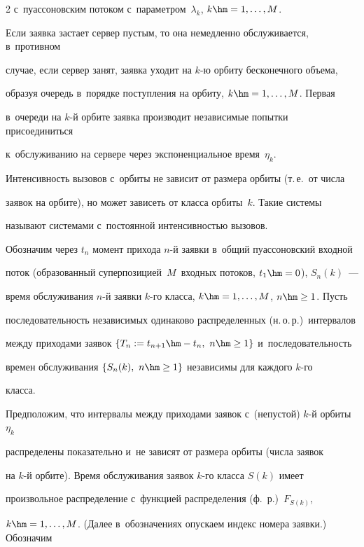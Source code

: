\begin{multicols}{2}
с~пуассоновским потоком с~па\-ра\-мет\-ром~$\lambda_k$, $k\hm=1,\ldots,M$. 


Если заявка застает сервер пустым, то она немедленно обслуживается, в~противном 


случае, если сервер занят,  заявка уходит на $k$-ю орбиту бесконечного объема, 


образуя очередь в~порядке поступления на орбиту, $k\hm=1,\ldots,M$. Первая 


в~очереди на $k$-й орбите заявка производит независимые попытки присоединиться 


к~обслуживанию на сервере через экспоненциальное  время~$\eta_k$.


Интенсивность вызовов с~орбиты не зависит от размера орбиты (т.\,е.\ от числа 


заявок на орбите), но может зависеть от класса орбиты~$k$. Такие сис\-те\-мы 


называют сис\-те\-ма\-ми  с~постоянной ин\-тен\-сив\-ностью вызовов.





Обозначим через $t_n$ момент прихода $n$-й заявки в~общий пуассоновский входной  


поток (образованный суперпозицией~$M$~входных потоков, $t_1\hm=0$),   $S_n{(k)}$~--- 


время обслуживания  $n$-й заявки  $k$-го класса,  $k\hm=1,\ldots,M$, $n\hm\ge1$. Пусть 


последовательность независимых одинаково распределенных (н.\,о.\,р.)\ интервалов 


между приходами заявок  $\{T_n:=t_{n+1}\hm-t_n,\ n\hm\ge 1\}$ и~последовательность 


времен обслуживания  $\{S_n{(k)},\ n\hm\ge1\}$ независимы для каждого  $k$-го 


класса.


Предположим, что интервалы между приходами заявок с~(непустой)  $k$-й орбиты~$\eta_k$ 


распределены показательно и~не зависят от размера орбиты  (числа заявок 


на $k$-й орбите). Время обслуживания заявок $k$-го класса  $S(k)$ имеет 


произвольное распределение  с~функцией распределения (ф.~р.)\ $F_{S(k)}$, 


$k\hm=1,\ldots, M$. (Далее в~обозначениях  опускаем индекс номера заявки.)  Обозначим


\begin{equation*}



\end{equation*}
\end{multicols}
